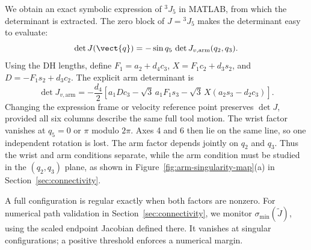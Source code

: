 We obtain an exact symbolic expression of ${}^3J_5$ in MATLAB, from which the determinant is extracted.
The zero block of $J={}^3J_5$ makes the determinant easy to evaluate:
\begin{equation}
 \det J(\vect{q})=-\sin q_5\,\det J_{v,\mathrm{arm}}(q_2,q_3).
 \label{eq:jacobian-determinant}
\end{equation}
Using the DH lengths, define $F_1=a_2+d_4c_3$, $X=F_1c_2+d_3s_2$, and
$D=-F_1s_2+d_3c_2$. The explicit arm determinant is
\begin{equation}
 \det J_{v,\mathrm{arm}}=-\frac{d_4}{2}
 \left[a_1Dc_3-\sqrt3\,a_1F_1s_3
       -\sqrt3\,X(a_2s_3-d_2c_3)\right].
 \label{eq:jacobian-arm-factor}
\end{equation}
Changing the expression frame or velocity reference point preserves
$\det J$, provided all six columns describe the same full tool motion.
The wrist factor vanishes at $q_5=0$ or
$\pi$ modulo $2\pi$. Axes 4 and 6 then lie on the same line, so one
independent rotation is lost. The arm factor depends jointly on $q_2$ and
$q_3$. Thus the wrist and arm conditions separate, while the arm condition
must be studied in the $(q_2,q_3)$ plane, as shown in
Figure~\ref{fig:arm-singularity-map}(a) in Section~\ref{sec:connectivity}.

A full configuration is regular exactly when both factors are nonzero.
For numerical path validation in Section~\ref{sec:connectivity}, we monitor
$\sigma_{\min}(\widetilde J)$, using the scaled endpoint Jacobian defined there.
It vanishes at singular configurations; a positive threshold enforces a numerical margin.
